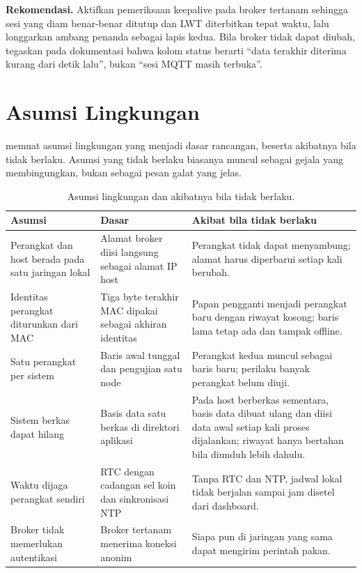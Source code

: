 \textbf{Rekomendasi.} Aktifkan pemeriksaan keepalive pada broker tertanam sehingga
sesi yang diam benar-benar ditutup dan LWT diterbitkan tepat waktu, lalu longgarkan
ambang penanda sebagai lapis kedua. Bila broker tidak dapat diubah, tegaskan pada
dokumentasi bahwa kolom status berarti ``data terakhir diterima kurang dari
\OfflineS{} detik lalu'', bukan ``sesi MQTT masih terbuka''.

\section{Asumsi Lingkungan}

 memuat asumsi lingkungan yang menjadi dasar rancangan,
beserta akibatnya bila tidak berlaku. Asumsi yang tidak berlaku biasanya muncul
sebagai gejala yang membingungkan, bukan sebagai pesan galat yang jelas.

\begin{table}[H]
\centering
\caption{Asumsi lingkungan dan akibatnya bila tidak berlaku.}
\label{tab:09-asumsi}
\small
\begin{tabular}{@{}p{3.9cm}p{4.9cm}p{6.2cm}@{}}
\toprule
\textbf{Asumsi} & \textbf{Dasar} & \textbf{Akibat bila tidak berlaku} \\
\midrule
Perangkat dan host berada pada satu jaringan lokal & Alamat broker diisi langsung
sebagai alamat IP host & Perangkat tidak dapat menyambung; alamat harus diperbarui
setiap kali berubah. \\
Identitas perangkat diturunkan dari MAC & Tiga byte terakhir MAC dipakai sebagai
akhiran identitas & Papan pengganti menjadi perangkat baru dengan riwayat kosong;
baris lama tetap ada dan tampak offline. \\
Satu perangkat per sistem & Baris awal tunggal dan pengujian satu node & Perangkat
kedua muncul sebagai baris baru; perilaku banyak perangkat belum diuji. \\
Sistem berkas dapat hilang & Basis data satu berkas di direktori aplikasi & Pada host
berberkas sementara, basis data dibuat ulang dan diisi data awal setiap kali proses
dijalankan; riwayat hanya bertahan bila diunduh lebih dahulu. \\
Waktu dijaga perangkat sendiri & RTC dengan cadangan sel koin dan sinkronisasi NTP &
Tanpa RTC dan NTP, jadwal lokal tidak berjalan sampai jam disetel dari dashboard. \\
Broker tidak memerlukan autentikasi & Broker tertanam menerima koneksi anonim & Siapa
pun di jaringan yang sama dapat mengirim perintah pakan. \\
\bottomrule
\end{tabular}
\end{table}

